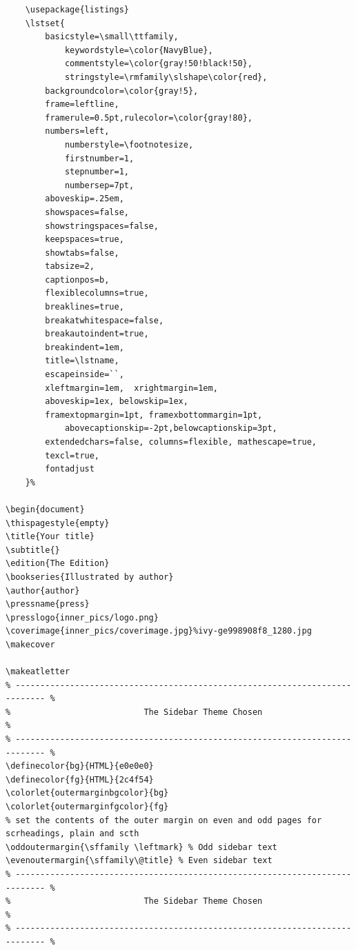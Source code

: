 \documentclass[lang=en,12pt]{beautybook}
\begin{document}
\begin{lstlisting}
    \usepackage{listings}
    \lstset{
        basicstyle=\small\ttfamily,	
            keywordstyle=\color{NavyBlue}, 
            commentstyle=\color{gray!50!black!50},   	
            stringstyle=\rmfamily\slshape\color{red}, 	
        backgroundcolor=\color{gray!5},     
        frame=leftline,						
        framerule=0.5pt,rulecolor=\color{gray!80}, 
        numbers=left,				
            numberstyle=\footnotesize,	
            firstnumber=1,
            stepnumber=1,                  	
            numbersep=7pt,               	
        aboveskip=.25em, 			
        showspaces=false,               	
        showstringspaces=false,        
        keepspaces=true, 					
        showtabs=false,                 	
        tabsize=2,                     		
        captionpos=b,                   	
        flexiblecolumns=true, 			
        breaklines=true,                	
        breakatwhitespace=false,        	
        breakautoindent=true,			
        breakindent=1em, 			
        title=\lstname,				
        escapeinside=``,  		
        xleftmargin=1em,  xrightmargin=1em,     
        aboveskip=1ex, belowskip=1ex,
        framextopmargin=1pt, framexbottommargin=1pt,
            abovecaptionskip=-2pt,belowcaptionskip=3pt,
        extendedchars=false, columns=flexible, mathescape=true,
        texcl=true,
        fontadjust
    }%

\begin{document}
\thispagestyle{empty}
\title{Your title}
\subtitle{}
\edition{The Edition}
\bookseries{Illustrated by author}
\author{author}
\pressname{press}
\presslogo{inner_pics/logo.png}
\coverimage{inner_pics/coverimage.jpg}%ivy-ge998908f8_1280.jpg
\makecover

\makeatletter
% ---------------------------------------------------------------------------- %
%                           The Sidebar Theme Chosen                           %
% ---------------------------------------------------------------------------- %
\definecolor{bg}{HTML}{e0e0e0}
\definecolor{fg}{HTML}{2c4f54}
\colorlet{outermarginbgcolor}{bg}
\colorlet{outermarginfgcolor}{fg}
% set the contents of the outer margin on even and odd pages for scrheadings, plain and scth
\oddoutermargin{\sffamily \leftmark} % Odd sidebar text
\evenoutermargin{\sffamily\@title} % Even sidebar text
% ---------------------------------------------------------------------------- %
%                           The Sidebar Theme Chosen                           %
% ---------------------------------------------------------------------------- %


\end{lstlisting}
\end{document}
